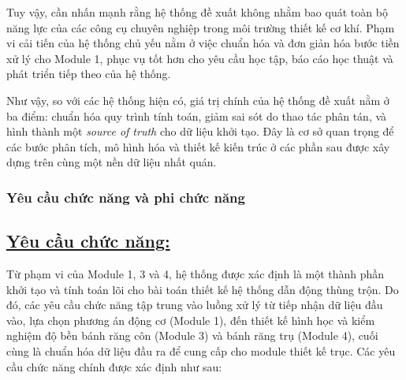 \documentclass[a4paper]{article}
\begin{document}
Tuy vậy, cần nhấn mạnh rằng hệ thống đề xuất không nhằm bao quát toàn bộ năng lực của các công cụ chuyên nghiệp trong môi trường thiết kế cơ khí. Phạm vi cải tiến của hệ thống chủ yếu nằm ở việc chuẩn hóa và đơn giản hóa bước tiền xử lý cho Module 1, phục vụ tốt hơn cho yêu cầu học tập, báo cáo học thuật và phát triển tiếp theo của hệ thống.

Như vậy, so với các hệ thống hiện có, giá trị chính của hệ thống đề xuất nằm ở ba điểm: chuẩn hóa quy trình tính toán, giảm sai sót do thao tác phân tán, và hình thành một \textit{source of truth} cho dữ liệu khởi tạo. Đây là cơ sở quan trọng để các bước phân tích, mô hình hóa và thiết kế kiến trúc ở các phần sau được xây dựng trên cùng một nền dữ liệu nhất quán.

\subsubsection{Yêu cầu chức năng và phi chức năng}

\subsection*{\uline{Yêu cầu chức năng:}}
Từ phạm vi của Module 1, 3 và 4, hệ thống được xác định là một thành phần khởi tạo và tính toán lõi cho bài toán thiết kế hệ thống dẫn động thùng trộn. Do đó, các yêu cầu chức năng tập trung vào luồng xử lý từ tiếp nhận dữ liệu đầu vào, lựa chọn phương án động cơ (Module 1), đến thiết kế hình học và kiểm nghiệm độ bền bánh răng côn (Module 3) và bánh răng trụ (Module 4), cuối cùng là chuẩn hóa dữ liệu đầu ra để cung cấp cho module thiết kế trục. Các yêu cầu chức năng chính được xác định như sau:
\end{document}

